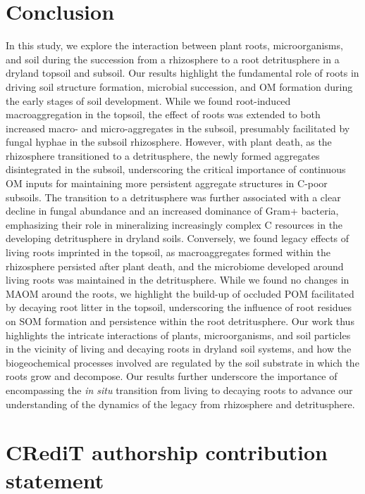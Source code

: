 \section{Conclusion}

In this study, we explore the interaction between plant roots, microorganisms, and soil during the succession from a rhizosphere to a root detritusphere in a dryland topsoil and subsoil. Our results highlight the fundamental role of roots in driving soil structure formation, microbial succession, and OM formation during the early stages of soil development. While we found root-induced macroaggregation in the topsoil, the effect of roots was extended to both increased macro- and micro-aggregates in the subsoil, presumably facilitated by fungal hyphae in the subsoil rhizosphere. However, with plant death, as the rhizosphere transitioned to a detritusphere, the newly formed aggregates disintegrated in the subsoil, underscoring the critical importance of continuous OM inputs for maintaining more persistent aggregate structures in C-poor subsoils. The transition to a detritusphere was further associated with a clear decline in fungal abundance and an increased dominance of Gram+ bacteria, emphasizing their role in mineralizing increasingly complex C resources in the developing detritusphere in dryland soils. Conversely, we found legacy effects of living roots imprinted in the topsoil, as macroaggregates formed within the rhizosphere persisted after plant death, and the microbiome developed around living roots was maintained in the detritusphere. While we found no changes in MAOM around the roots, we highlight the build-up of occluded POM facilitated by decaying root litter in the topsoil, underscoring the influence of root residues on SOM formation and persistence within the root detritusphere. Our work thus highlights the intricate interactions of plants, microorganisms, and soil particles in the vicinity of living and decaying roots in dryland soil systems, and how the biogeochemical processes involved are regulated by the soil substrate in which the roots grow and decompose. Our results further underscore the importance of encompassing the \textit{in situ} transition from living to decaying roots to advance our understanding of the dynamics of the legacy from rhizosphere and detritusphere.

\section*{CRediT authorship contribution statement}

